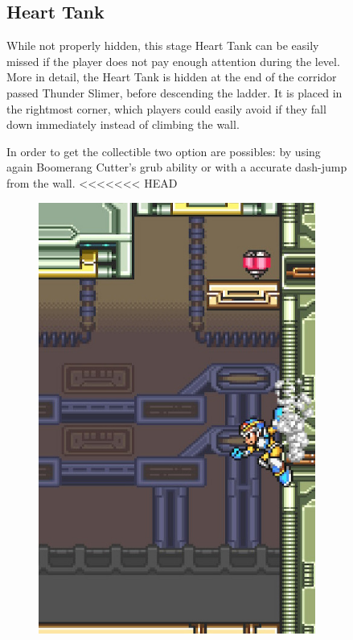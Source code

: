 \begin{figure}[htp]
\subsection{Heart Tank}
While not properly hidden, this stage Heart Tank can be easily missed if the player does not pay enough attention during the level. More in detail, the Heart Tank is hidden at the end of the corridor passed Thunder Slimer, before descending the ladder. It is placed in the rightmost corner, which players could easily avoid if they fall down immediately instead of climbing the wall.

In order to get the collectible two option are possibles: by using again Boomerang Cutter's grub ability or with a accurate dash-jump from the wall.
<<<<<<< HEAD
\begin{figure}[htp]
	\centering
	\includegraphics[width=0.3\linewidth]{figures/X1/Spark_mandrill/Mandrill_heart.jpg}
\end{figure}


\end{figure}
